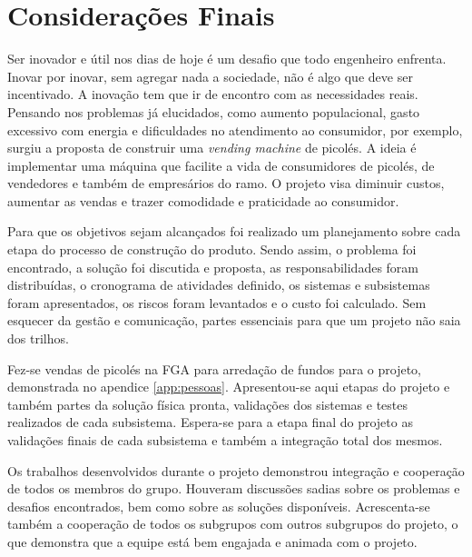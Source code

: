 \chapter{Considerações Finais}


Ser inovador e útil nos dias de hoje é um desafio que todo engenheiro enfrenta. Inovar por inovar, sem agregar nada a sociedade, não é algo que deve ser incentivado. A inovação tem que ir de encontro com as necessidades reais. Pensando nos problemas já elucidados, como aumento populacional, gasto excessivo com energia e dificuldades no atendimento ao consumidor, por exemplo, surgiu a  proposta de construir uma  \textit{vending machine} de picolés.  A ideia é implementar uma máquina que facilite a vida de consumidores de picolés, de vendedores  e também de empresários do ramo. O projeto visa diminuir custos, aumentar as vendas e trazer comodidade e praticidade ao consumidor. 

Para que os objetivos sejam alcançados foi realizado um planejamento sobre cada etapa do processo de construção do produto. Sendo assim, o problema foi encontrado, a solução foi discutida e proposta, as responsabilidades foram distribuídas, o cronograma de atividades definido, os sistemas e subsistemas foram apresentados, os riscos foram levantados e o custo foi calculado. Sem esquecer da gestão e comunicação, partes essenciais para que um projeto não saia dos trilhos. 

Fez-se vendas de picolés na FGA para arredação de fundos para o projeto, demonstrada no apendice \ref{app:pessoas}. Apresentou-se aqui etapas do projeto e também partes da solução física pronta, validações dos sistemas e testes realizados de cada subsistema. Espera-se para a etapa final do projeto as validações finais de cada subsistema e também a integração total dos mesmos.

Os trabalhos desenvolvidos durante o projeto demonstrou integração e cooperação de todos os membros do grupo. Houveram discussões sadias sobre os problemas e desafios encontrados, bem como sobre as soluções disponíveis. Acrescenta-se também a cooperação de todos os subgrupos com outros subgrupos do projeto, o que demonstra que a equipe está bem engajada e animada com o projeto.






